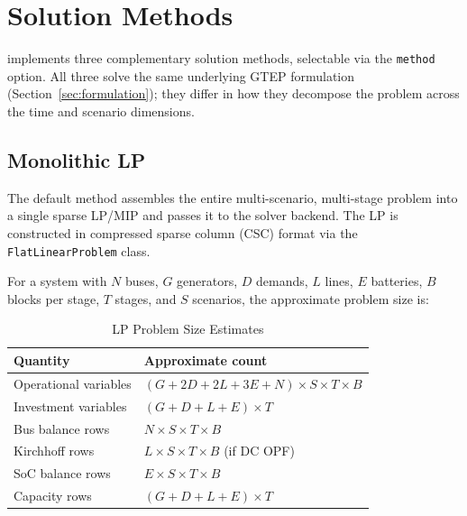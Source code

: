 
\section{Solution Methods}
\label{sec:methods}

\gtopt{} implements three complementary solution methods, selectable via the
\texttt{method} option.  All three solve the same underlying GTEP formulation
(Section~\ref{sec:formulation}); they differ in how they decompose the
problem across the time and scenario dimensions.

\subsection{Monolithic LP}
\label{sec:monolithic}

The default method assembles the entire multi-scenario, multi-stage problem
into a single sparse LP/MIP and passes it to the solver backend.  The LP
is constructed in compressed sparse column (CSC) format via the
\texttt{FlatLinearProblem} class.

For a system with $N$ buses, $G$ generators, $D$ demands, $L$ lines,
$E$ batteries, $B$ blocks per stage, $T$ stages, and $S$ scenarios, the
approximate problem size is:

\begin{table}[h]
  \centering
  \caption{LP Problem Size Estimates}
  \label{tab:lp_size}
  \begin{tabular}{@{}ll@{}}
    \toprule
    Quantity & Approximate count \\
    \midrule
    Operational variables & $(G{+}2D{+}2L{+}3E{+}N) \times S \times T \times B$ \\
    Investment variables  & $(G{+}D{+}L{+}E) \times T$ \\
    Bus balance rows      & $N \times S \times T \times B$ \\
    Kirchhoff rows        & $L \times S \times T \times B$ (if DC OPF) \\
    SoC balance rows      & $E \times S \times T \times B$ \\
    Capacity rows         & $(G{+}D{+}L{+}E) \times T$ \\
    \bottomrule
  \end{tabular}
\end{table}

